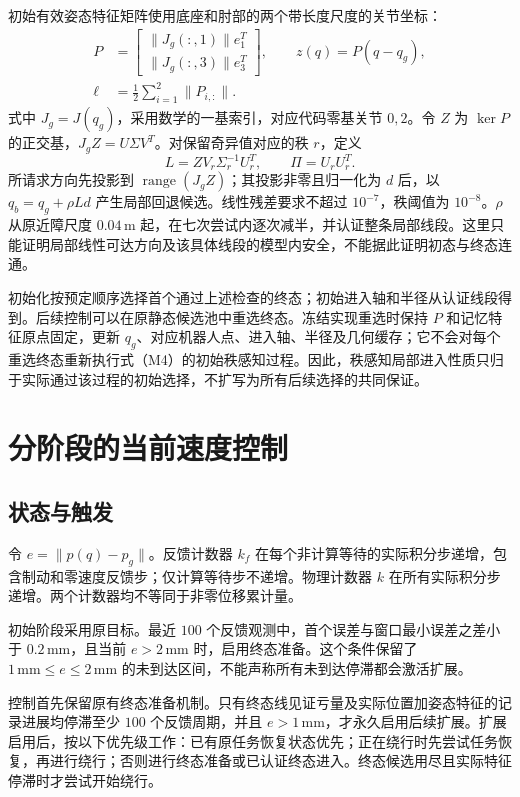 初始有效姿态特征矩阵使用底座和肘部的两个带长度尺度的关节坐标：
\begin{equation}
\begin{aligned}
 P&=\begin{bmatrix}\|J_g(:,1)\|e_1^T\\\|J_g(:,3)\|e_3^T\end{bmatrix},\qquad z(q)=P(q-q_g),\\
 \ell&=\tfrac12\sum_{i=1}^{2}\|P_{i,:}\|.
\end{aligned}\tag{M3}
\end{equation}
式中 $J_g=J(q_g)$，采用数学的一基索引，对应代码零基关节 $0,2$。令 $Z$ 为 $\ker P$ 的正交基，$J_gZ=U\Sigma V^T$。对保留奇异值对应的秩 $r$，定义
\begin{equation}
 L=ZV_r\Sigma_r^{-1}U_r^T,\qquad \Pi=U_rU_r^T.\tag{M4}
\end{equation}
所请求方向先投影到 $\operatorname{range}(J_gZ)$；其投影非零且归一化为 $d$ 后，以 $q_b=q_g+\rho Ld$ 产生局部回退候选。线性残差要求不超过 $10^{-7}$，秩阈值为 $10^{-8}$。$\rho$ 从原近障尺度 $0.04\,\mathrm m$ 起，在七次尝试内逐次减半，并认证整条局部线段。这里只能证明局部线性可达方向及该具体线段的模型内安全，不能据此证明初态与终态连通。

初始化按预定顺序选择首个通过上述检查的终态；初始进入轴和半径从认证线段得到。后续控制可以在原静态候选池中重选终态。冻结实现重选时保持 $P$ 和记忆特征原点固定，更新 $q_g$、对应机器人点、进入轴、半径及几何缓存；它不会对每个重选终态重新执行式（M4）的初始秩感知过程。因此，秩感知局部进入性质只归于实际通过该过程的初始选择，不扩写为所有后续选择的共同保证。

\section{分阶段的当前速度控制}
\subsection{状态与触发}
令 $e=\|p(q)-p_g\|$。反馈计数器 $k_f$ 在每个非计算等待的实际积分步递增，包含制动和零速度反馈步；仅计算等待步不递增。物理计数器 $k$ 在所有实际积分步递增。两个计数器均不等同于非零位移累计量。

初始阶段采用原目标。最近 $100$ 个反馈观测中，首个误差与窗口最小误差之差小于 $0.2\,\mathrm{mm}$，且当前 $e>2\,\mathrm{mm}$ 时，启用终态准备。这个条件保留了 $1\,\mathrm{mm}\le e\le2\,\mathrm{mm}$ 的未到达区间，不能声称所有未到达停滞都会激活扩展。

控制首先保留原有终态准备机制。只有终态线见证亏量及实际位置加姿态特征的记录进展均停滞至少 $100$ 个反馈周期，并且 $e>1\,\mathrm{mm}$，才永久启用后续扩展。扩展启用后，按以下优先级工作：已有原任务恢复状态优先；正在绕行时先尝试任务恢复，再进行绕行；否则进行终态准备或已认证终态进入。终态候选用尽且实际特征停滞时才尝试开始绕行。

